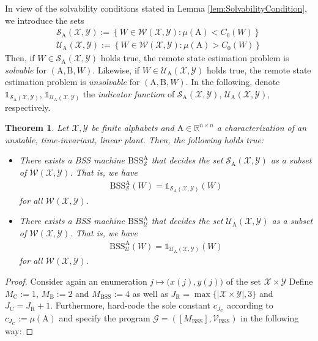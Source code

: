 \documentclass[conference]{IEEEtran}
\def\X{{\mathcal X}}
\def\Y{{\mathcal Y}}
\def\G{{\mathcal G}}
\def\V{{\mathcal V}}
\def\W{{\mathcal W}}
\def\S{{\mathcal S}}
\def\U{{\mathcal U}}
\def\RR{{\mathbb R}}
\def\mA{\bm{\mathrm{A}}}
\def\mB{\bm{\mathrm{B}}}
\newcommand{\BSS}{\mathrm{BSS}}
\newtheorem{Theorem}{Theorem}
\begin{document}
	In view of the solvability conditions stated in Lemma \ref{lem:SolvabilityCondition}, we introduce the sets
	\begin{align*}	\S_{\mA}(\X,\Y) := \left\{ W\in \W(\X,\Y) : \mu(\mA) < C_0(W) \right\} \\ 
					\U_{\mA}(\X,\Y) := \left\{ W\in \W(\X,\Y) : \mu(\mA) > C_0(W) \right\} 
	\end{align*}
	Then, if \(W\in \S_{\mA}(\X,\Y)\) holds true, the remote state estimation problem is \emph{solvable} for \((\mA,\mB, W)\).
	Likewise, if \(W\in \U_{\mA}(\X,\Y)\) holds true, the remote state estimation problem is \emph{unsolvable} for \((\mA,\mB, W)\).
	In the following, denote \(\mathds{1}_{\S_{\mA}(\X,\Y)}\), \(\mathds{1}_{\U_{\mA}(\X,\Y)}\) the \emph{indicator function}
	of \(\S_{\mA}(\X,\Y)\), \(\U_{\mA}(\X,\Y)\), respectively.
	\begin{Theorem}	\label{thm:RemoteStateEstimationBSSDecidable}
					Let \(\X,\Y\) be finite alphabets and \(\mA \in \RR^{n\times n}\) a characterization of an unstable, time-invariant, 
					linear plant. Then, the following holds true:
					\begin{itemize}	\item There exists a BSS machine \(\BSS_{\S}^{\mA}\) that \emph{decides} the set
										\(\S_{\mA}(\X,\Y)\) as a subset of \(\W(\X,\Y)\). That is, we have
										\begin{align*}	\BSS_{\S}^{\mA}(W) = 	\mathds{1}_{\S_{\mA}(\X,\Y)}(W)
										\end{align*}
										for all \(\W(\X,\Y)\).
									\item There exists a BSS machine \(\BSS_{\U}^{\mA}\) that \emph{decides} the set
										\(\U_{\mA}(\X,\Y)\) as a subset of \(\W(\X,\Y)\). That is, we have
										\begin{align*}	\BSS_{\U}^{\mA}(W) = 	\mathds{1}_{\U_{\mA}(\X,\Y)}(W)
										\end{align*}
										for all \(\W(\X,\Y)\).
					\end{itemize}
	\end{Theorem}\begin{proof}
					Consider again an enumeration \(j \mapsto \big(x(j), y(j)\big)\) of the set \(\X\times\Y\) 
					Define \(M_\mathrm{C} := 1\), \(M_\mathrm{B} := 2\) and \(M_\BSS := 4\) as well as \(J_\mathrm{R} = \max\{|\X\times \Y|,3\}\) and 
					\(J_\mathrm{C} = J_\mathrm{R} + 1\). Furthermore, hard-code the sole constant \(c_{J_\mathrm{C}}\) according to
					\(c_{J_\mathrm{C} } := \mu(\mA)\) and specify the program \(\G = ([M_\BSS],\V_\BSS)\) in the following way:

\end{proof}
\end{document}
